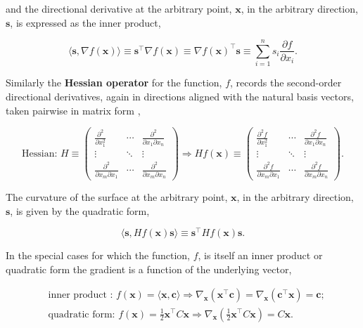 \documentclass[12pt, twoside, draft]{article}
\begin{document}
 and the directional derivative at the arbitrary point, $\mathbf{x}$,  in the arbitrary direction, $\mathbf{s}$, is expressed as the inner product,

\begin{equation}
\langle \mathbf{s}, \nabla f(\mathbf{x}) \rangle \equiv \mathbf{s}^\top \nabla f(\mathbf{x}) \equiv \nabla f(\mathbf{x})^\top \mathbf{s} \equiv \sum_{i=1}^n s_i \frac{\partial f}{\partial x_i}.
\end{equation}

Similarly the \textbf{Hessian operator} for the function, $f$, records the second-order directional derivatives, again in directions aligned with the natural basis vectors, taken pairwise in matrix form ,

\begin{equation}\label{eq:Hessian}
\text{Hessian: }H \equiv 
\begin{pmatrix} 
\frac{\partial^2}{\partial x_1^2} & \cdots & \frac{\partial^2}{\partial x_1 \partial x_n} \\
\vdots & \ddots & \vdots \\
\frac{\partial^2}{\partial x_m \partial x_1} & \cdots & \frac{\partial^2}{\partial x_m \partial x_n}
\end{pmatrix} \Rightarrow
H f(\mathbf{x}) \equiv 
\begin{pmatrix} 
\frac{\partial^2 f}{\partial x_1^2} & \cdots & \frac{\partial^2 f}{\partial x_1 \partial x_n} \\
\vdots & \ddots & \vdots \\
\frac{\partial^2 f}{\partial x_m \partial x_1} & \cdots & \frac{\partial^2 f}{\partial x_m \partial x_n}
\end{pmatrix}.
\end{equation} 

The curvature of the surface at the arbitrary point, $\mathbf{x}$, in the arbitrary direction, $\mathbf{s}$, is given by the quadratic form,

\begin{equation}
\langle \mathbf{s}, H f(\mathbf{x})  \mathbf{s} \rangle \equiv \mathbf{s}^\top H f(\mathbf{x})  \mathbf{s}.
\end{equation}

In the special cases for which the function, $f$, is itself an inner product or quadratic form the gradient is a function of the underlying vector,

\begin{align}\label{eq:gradient_operations}
&\text{inner product : } f(\mathbf{x}) = \langle \mathbf{x}, \mathbf{c} \rangle \Rightarrow \nabla_\mathbf{x} \left( \mathbf{x}^\top \mathbf{c} \right) = \nabla_\mathbf{x} \left( \mathbf{c}^\top \mathbf{x} \right) = \mathbf {c}; \\
&\text{quadratic form: } f(\mathbf{x}) = \frac{1}{2} \mathbf{x}^\top C \mathbf{x} \Rightarrow  \nabla_\mathbf{x} \left( \frac{1}{2} \mathbf{x}^\top C \mathbf{x} \right) = C \mathbf{x}.
\end{align}
\end{document}
